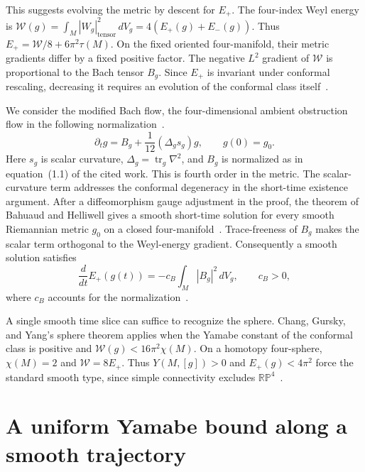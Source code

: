 \documentclass[11pt]{article}
\numberwithin{equation}{section}
\begin{document}
This suggests evolving the metric by descent for \(E_+\). The
four-index Weyl energy is
\(\mathcal W(g)=\int_M|W_g|_{\mathrm{tensor}}^2\,dV_g=4(E_+(g)+E_-(g))\).
Thus \(E_+=\mathcal W/8+6\pi^2\tau(M)\). On the fixed oriented
four-manifold, their metric gradients differ by a fixed positive factor.
The negative \(L^2\) gradient of \(\mathcal W\) is proportional to the
Bach tensor \(B_g\). Since \(E_+\) is invariant under conformal
rescaling, decreasing it requires an evolution of the conformal
class itself~\cite[\S1 and \S2.3]{BahuaudGuentherIsenbergMazzeo2025Bach}.

We consider the modified Bach flow, the four-dimensional ambient
obstruction flow in the following normalization~\cite[eq.~(1.2)]{BahuaudGuentherIsenbergMazzeo2025Bach}.
\begin{equation}\label{eq:modified-bach}
 \partial_t g=B_g+\frac{1}{12}(\Delta_g s_g)g,\qquad g(0)=g_0 .
\end{equation}
Here \(s_g\) is scalar curvature, \(\Delta_g=\operatorname{tr}_g\nabla^2\),
and \(B_g\) is normalized as in equation~(1.1) of the cited work.
This is fourth order in the metric. The scalar-curvature term addresses
the conformal degeneracy in the short-time existence argument. After
a diffeomorphism gauge adjustment in the proof, the theorem of Bahuaud
and Helliwell gives a smooth short-time solution for every smooth
Riemannian metric \(g_0\) on a closed four-manifold~\cite[Theorem C]{BahuaudHelliwell2011HigherOrder}.
Trace-freeness of \(B_g\) makes the scalar term orthogonal to the
Weyl-energy gradient. Consequently a smooth solution satisfies
\begin{equation}\label{eq:weyl-dissipation}
 \frac{d}{dt}E_+(g(t))=-c_B\int_M |B_g|^2\,dV_g,\qquad c_B>0 ,
\end{equation}
where \(c_B\) accounts for the normalization~\cite[\S2.3]{BahuaudGuentherIsenbergMazzeo2025Bach}.

A single smooth time slice can suffice to recognize the sphere.
Chang, Gursky, and Yang's sphere theorem applies when the Yamabe
constant of the conformal class is positive and
\(\mathcal W(g)<16\pi^2\chi(M)\). On a homotopy four-sphere,
\(\chi(M)=2\) and \(\mathcal W=8E_+\). Thus
\(Y(M,[g])>0\) and \(E_+(g)<4\pi^2\) force the standard smooth
type, since simple connectivity excludes
\(\mathbb{RP}^4\)~\cite[Theorem A]{ChangGurskyYang2003}.

\section{A uniform Yamabe bound along a smooth trajectory}
\end{document}
